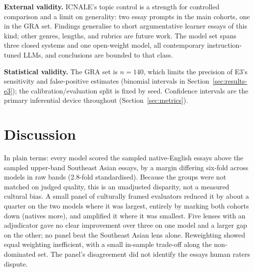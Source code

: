 \textbf{External validity.} ICNALE's topic control is a strength for
controlled comparison and a limit on generality: two essay prompts
in the main cohorts, one in the GRA set. Findings generalise to
short argumentative learner essays of this kind; other genres,
lengths, and rubrics are future work. The model set spans three
closed systems and one open-weight model, all contemporary
instruction-tuned LLMs, and conclusions are bounded to that class.

\textbf{Statistical validity.} The GRA set is $n = 140$, which
limits the precision of E3's sensitivity and false-positive
estimates (binomial intervals in Section~\ref{sec:results-e3}); the
calibration/evaluation split is fixed by seed. Confidence intervals
are the primary inferential device throughout
(Section~\ref{sec:metrics}).

\section{Discussion}
\label{sec:results-discussion}

In plain terms: every model scored the sampled native-English
essays above the sampled upper-band Southeast Asian essays, by a
margin differing six-fold across models in raw bands (2.8-fold
standardised). Because the groups were not matched on judged
quality, this is an unadjusted disparity, not a measured cultural
bias. A small panel of culturally framed evaluators reduced it by
about a quarter on the two models where it was largest, entirely by
marking both cohorts down (natives more), and amplified it where it
was smallest. Five lenses with an adjudicator gave no clear
improvement over three on one model and a larger gap on the other;
no panel beat the Southeast Asian lens alone. Reweighting showed
equal weighting inefficient, with a small in-sample trade-off along
the non-dominated set. The panel's disagreement did not identify
the essays human raters dispute.

